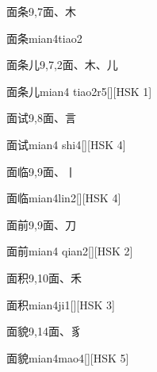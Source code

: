 \begin{entry}{面条}{9,7}{⾯、⽊}
  \begin{phonetics}{面条}{mian4tiao2}
  \end{phonetics}
\end{entry}

\begin{entry}{面条儿}{9,7,2}{⾯、⽊、⼉}
  \begin{phonetics}{面条儿}{mian4 tiao2r5}[][HSK 1]
  \end{phonetics}
\end{entry}

\begin{entry}{面试}{9,8}{⾯、⾔}
  \begin{phonetics}{面试}{mian4 shi4}[][HSK 4]
  \end{phonetics}
\end{entry}

\begin{entry}{面临}{9,9}{⾯、⼁}
  \begin{phonetics}{面临}{mian4lin2}[][HSK 4]
  \end{phonetics}
\end{entry}

\begin{entry}{面前}{9,9}{⾯、⼑}
  \begin{phonetics}{面前}{mian4 qian2}[][HSK 2]
  \end{phonetics}
\end{entry}

\begin{entry}{面积}{9,10}{⾯、⽲}
  \begin{phonetics}{面积}{mian4ji1}[][HSK 3]
  \end{phonetics}
\end{entry}

\begin{entry}{面貌}{9,14}{⾯、⾘}
  \begin{phonetics}{面貌}{mian4mao4}[][HSK 5]
  \end{phonetics}
\end{entry}

